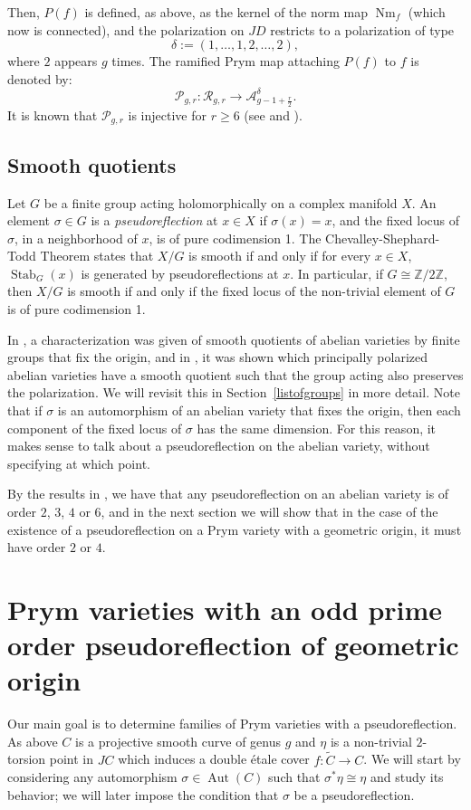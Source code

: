 \documentclass[preprint,12pt]{amsart}
\def\bZ{\ensuremath{\mathbb{Z}}}
\def\cA{\ensuremath{\mathcal{A}}}
\def\cP{\ensuremath{\mathcal{P}}}
\def\cR{\ensuremath{\mathcal{R}}}
\DeclareMathOperator{\Aut}{Aut}
\DeclareMathOperator{\Nm}{Nm}
\theoremstyle{plain}
\theoremstyle{definition}
\begin{document}
Then, $P(f)$ is defined, as above, as the kernel of the norm map $\Nm_f$ (which now is connected), and the polarization on $JD$ restricts to a polarization of type 
\[
\delta:=(1,\ldots,1,2,\ldots,2),
\]
where $2$ appears $g$ times.
The ramified Prym map attaching $P(f)$ to $f$ is denoted by:
\[
\cP_{g,r}: \cR_{g,r} \to \cA_{g-1+\frac r2}^{\delta}.
\]
It is known that $\cP_{g,r}$ is injective for $r\ge 6$ (see \cite{Ik} and \cite{NO}).

\subsection{Smooth quotients}
Let $G$ be a finite group acting holomorphically on a complex manifold $X$.
An element $\sigma\in G$ is a \textit{pseudoreflection} at $x\in X$ if $\sigma(x)=x$, and the fixed locus of $\sigma$, in a neighborhood of $x$, is of pure codimension 1.
The Chevalley-Shephard-Todd Theorem states that $X/G$ is smooth if and only if for every $x\in X$, $\operatorname{Stab}_G(x)$ is generated by pseudoreflections at $x$.
In particular, if $G\cong\bZ/2\bZ$, then $X/G$ is smooth if and only if the fixed locus of the non-trivial element of $G$ is of pure codimension 1.

In \cite{ALA1}, a characterization was given of smooth quotients of abelian varieties by finite groups that fix the origin, and in \cite{ALA}, it was shown which principally polarized abelian varieties have a smooth quotient such that the group acting also preserves the polarization.
We will revisit this in Section~\ref{listofgroups} in more detail.
Note that if $\sigma$ is an automorphism of an abelian variety that fixes the origin, then each component of the fixed locus of $\sigma$ has the same dimension.
For this reason, it makes sense to talk about a pseudoreflection on the abelian variety, without specifying at which point.

By the results in \cite{ALA1}, we have that any pseudoreflection on an abelian variety is of order $2$, $3$, $4$ or $6$, and in the next section we will show that in the case of the existence of a pseudoreflection on a Prym variety with a geometric origin, it must have order $2$ or $4$.

\section{Prym varieties with an odd prime order pseudoreflection of geometric origin}
\label{sec:pseudOrigin}

Our main goal is to determine families of Prym varieties with a pseudoreflection.
As above $C$ is a projective smooth curve of genus $g$ and $\eta$ is a non-trivial $2$-torsion point in $JC$ which induces a double étale cover $f:\tilde{C}\to C$.
We will start by considering any automorphism $\sigma\in\Aut(C)$ such that $\sigma^*\eta\cong\eta$ and study its behavior; we will later impose the condition that $\sigma$ be a pseudoreflection.
\end{document}
